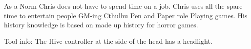 \begin{npcBox}[title=Norm: Chris]
    \begin{stressSection}
    \end{stressSection}
    \begin{tabularx}{\textwidth}{ XX }
    \end{tabularx}

    \begin{consequences}
    \item {}
    \item {}
    \item {}
    \end{consequences}

    \begin{npcDescription}

    As a Norm Chris does not have to spend time on a job. Chris uses all the spare time to entertain people GM-ing Cthulhu Pen and Paper role Playing games. His history knowledge is based on made up history for horror games.

    Tool info: The Hive controller at the side of the head has a headlight.

    \end{npcDescription}

\end{npcBox}

\newpage

